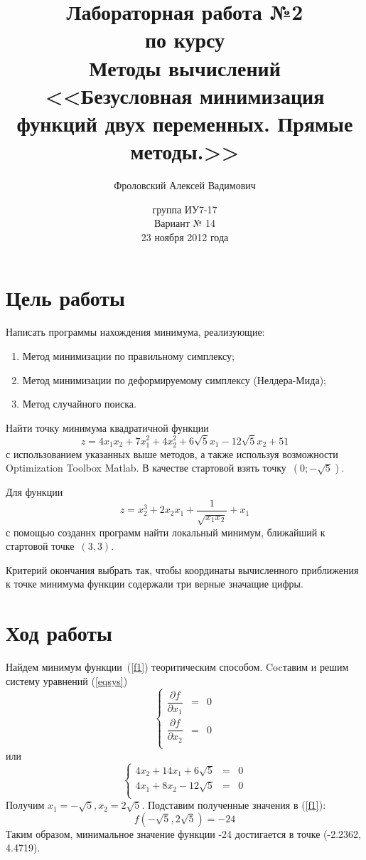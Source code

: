 \documentclass[12pt,a4paper,oneside]{report}
\title{Лабораторная работа №2\\по курсу\\Методы вычислений \\<<Безусловная минимизация функций двух переменных. Прямые методы.>>}
\author{Фроловский Алексей Вадимович}
\date{группа ИУ7-17 \\ Вариант № 14\\23 ноября 2012 года}
\begin{document}
\maketitle
\section*{Цель работы}
Написать программы нахождения минимума, реализующие:
\begin{enumerate}
\item Метод минимизации по правильному симплексу;
\item Метод минимизации по деформируемому симплексу (Нелдера-Мида);
\item Метод случайного поиска.
\end{enumerate}

Найти точку минимума квадратичной функции
\begin{equation}
\label{f1}
z = 4x_{1}x_{2}+7x^{2}_{1}+4x^{2}_{2}+6\sqrt{5}x_{1}-12\sqrt{5}x_{2}+51
\end{equation}
с использованием указанных выше методов, а также используя возможности Optimization Toolbox Matlab. В качестве стартовой взять точку~$(0;-\sqrt{5})$. 

Для функции 
\begin{equation}
\label{f2}
z = x^{3}_{2}+2x_{2}x_{1} + \frac{1}{\sqrt{x_{1}x_{2}}} + x_{1}
\end{equation}
с помощью созданнх программ найти локальный минимум, ближайший к стартовой точке~$(3, 3)$.

Критерий окончания выбрать так, чтобы координаты вычисленного приближения к
точке минимума функции содержали три верные значащие цифры.

\section*{Ход работы}
Найдем минимум функции~(\ref{f1}) теоритическим способом. Cocтавим и решим систему уравнений (\ref{eqsys})
\begin{equation}
\label{eqsys}
\left\{  
 	\begin{array}{rcl}  
           \dfrac{\partial{f}}{\partial{x_{1}}} & = & 0 \\  
           \dfrac{\partial{f}}{\partial{x_{2}}} & = & 0 \\  
           \end{array}   
 \right.
\end{equation}
или
\begin{equation}
\label{eqsysext}
\left\{  
 	\begin{array}{rcl}  
           4x_{2} + 14x_{1} + 6\sqrt{5} & = & 0 \\  
           4x_{1} + 8x_{2} - 12\sqrt{5} & = & 0 \\  
           \end{array}   
 \right.
\end{equation}
Получим $x_{1} = -\sqrt{5}, x_{2} = 2\sqrt{5}$. Подставим полученные значения  в (\ref{f1}):
\begin{equation}
f(-\sqrt{5},2\sqrt{5}) = -24
\end{equation}
Таким образом, минимальное значение функции -24 достигается в точке (-2.2362,  4.4719).
\end{document}
